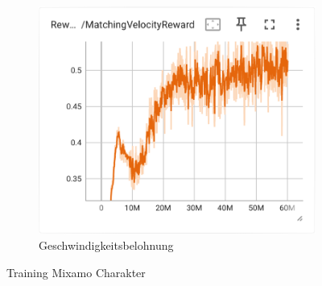 \begin{figure}[H]
\begin{subfigure}{.49\textwidth}
    \end{subfigure}
    \begin{subfigure}{.49\textwidth}
      \centering  
      \includegraphics[width=\textwidth]{img/106_vel_reward}
      \caption{Geschwindigkeitsbelohnung}
      \label{fig:106_vel_reward}
    \end{subfigure}
 \caption{Training Mixamo Charakter}
  \label{fig:training_mixamo_charakter}
\end{figure}

